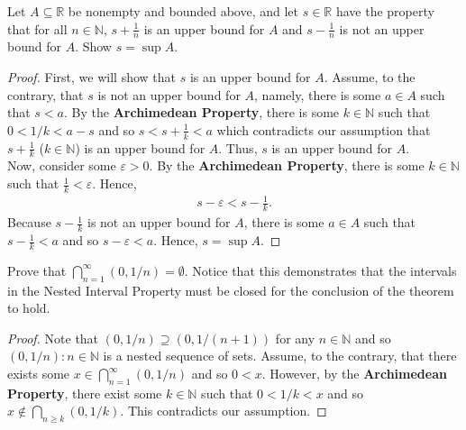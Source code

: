 \documentclass[12pt]{article}
\newcommand{\N}{\mathbb{N}}
\newcommand{\R}{\mathbb{R}}
\newenvironment{problem}[2][Problem]{\begin{trivlist}
		\item[\hskip \labelsep {\bfseries #1}\hskip \labelsep {\bfseries #2.}]}{\end{trivlist}}
\begin{document}
	\begin{problem}{1.4.2}
		Let $A\subseteq \R$ be nonempty and bounded above, and let $s\in \R$ have the property that for all $n\in \N$, $s+\frac{1}{n}$ is an upper bound for $A$ and $s-\frac{1}{n}$ is not an upper bound for $A$. Show $s=\sup A$.
		\begin{proof}
			First, we will show that $s$ is an upper bound for $A$. Assume, to the contrary, that $s$ is not an upper bound for $A$, namely, there is some $a\in A$ such that $s<a$. By the \textbf{Archimedean Property}, there is some $k\in \N$ such that $0<1/k < a-s$ and so $s<s+\frac{1}{k} <a$ which contradicts our assumption that $s+\frac{1}{k}$ ($k\in \N$) is an upper bound for $A$. Thus, $s$ is an upper bound for $A$.\\
			
			Now, consider some $\varepsilon > 0$. By the \textbf{Archimedean Property}, there is some $k\in \N$ such that $\frac{1}{k} < \varepsilon$. Hence,
			\begin{align*}
				s-\varepsilon < s-\frac{1}{k}.
			\end{align*}
			Because $s-\frac{1}{k}$ is not an upper bound for $A$, there is some $a\in A$ such that $s-\frac{1}{k} < a$ and so $s-\varepsilon < a$. Hence, $s=\sup A$.
		\end{proof}
	\end{problem}
	
	\begin{problem}{1.4.3}
		Prove that $\bigcap^{\infty}_{n=1} (0,1/n)=\emptyset$. Notice that this demonstrates that the intervals in the Nested Interval Property must be closed for the conclusion of the theorem to hold.
		\begin{proof}
			Note that $(0,1/n) \supseteq (0,1/(n+1))$ for any $n\in \N$ and so ${(0,1/n):n\in \N}$ is a nested sequence of sets. Assume, to the contrary, that there exists some $x\in \bigcap^{\infty}_{n=1} (0,1/n)$ and so $0<x$. However, by the \textbf{Archimedean Property}, there exist some $k\in \N$ such that $0<1/k<x$ and so $x\not\in \bigcap_{n\geq k} (0,1/k)$. This contradicts our assumption.
		\end{proof}
	\end{problem}
	
\end{document}
